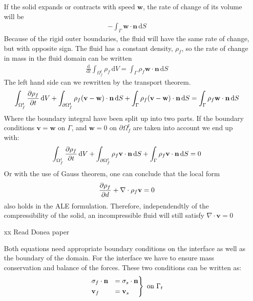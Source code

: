 If the solid expands or contracts with speed $\mathbf{w}$, the rate of change of its volume will be 
\begin{align}
-\int_\Gamma \mathbf{w} \cdot \mathbf{n} \,\mathrm{d}S
\end{align}
Because of the rigid outer boundaries, the fluid will have the same rate of change, but with opposite sign. The fluid has a constant density, $\rho_f$, so the rate of change in mass in the fluid domain can be written 
\begin{align}
\frac{\mathrm{d}}{\mathrm{d}t}\int_{\Omega_f^t} \rho_f \, \mathrm{d}V = \int_\Gamma \rho_f \mathbf{w} \cdot \mathbf{n} \,\mathrm{d}S
\end{align}
The left hand side can we rewritten by the transport theorem.
\begin{align}
\int_{\Omega_f^t} \frac{\partial \rho_f}{\partial t} \, \mathrm{d}V + \int_{\partial \Omega_f^t} \rho_f (\mathbf{v}-\mathbf{w}) \cdot \mathbf{n} \, \mathrm{d}S + \int_{\Gamma} \rho_f (\mathbf{v}-\mathbf{w}) \cdot \mathbf{n} \, \mathrm{d}S = \int_\Gamma \rho_f \mathbf{w} \cdot \mathbf{n} \,\mathrm{d}S
\end{align}
Where the boundary integral have been split up into two parts. If the boundary conditions $\mathbf{v}=\mathbf{w}$ on $\Gamma$, and $\mathbf{w} = 0$ on $\partial \Omega_f^t$ are taken into account we end up with: 
\begin{align}
\int_{\Omega_f^t} \frac{\partial \rho_f}{\partial t} \, \mathrm{d}V + \int_{\partial \Omega_f^t} \rho_f \mathbf{v} \cdot \mathbf{n} \, \mathrm{d}S + \int_{\Gamma} \rho_f \mathbf{v} \cdot \mathbf{n} \, \mathrm{d}S = 0
\end{align}
Or with the use of Gauss theorem, one can conclude that the local form
\begin{align}
\frac{\partial \rho_f}{\partial d} + \nabla \cdot \rho_f \mathbf{v} = 0
\end{align}
also holds in the ALE formulation. Therefore, independendtly of the compressibility of the solid, an incompressible fluid will still satisfy $\nabla \cdot \mathbf{v} = 0$


xx Read Donea paper \cite{Done04}

Both equations need appropriate boundary conditions on the interface as well as the boundary of the domain. For the interface we have to ensure mass conservation and balance of the forces. These two conditions can be written as:
\begin{align}
\begin{rcases}
\sigma_f \cdot \mathbf{n} & =  \sigma_s \cdot \mathbf{n} \\
\mathbf{v}_f & = \mathbf{v}_s
\end{rcases}
\text{ on } \Gamma_t
\end{align}








